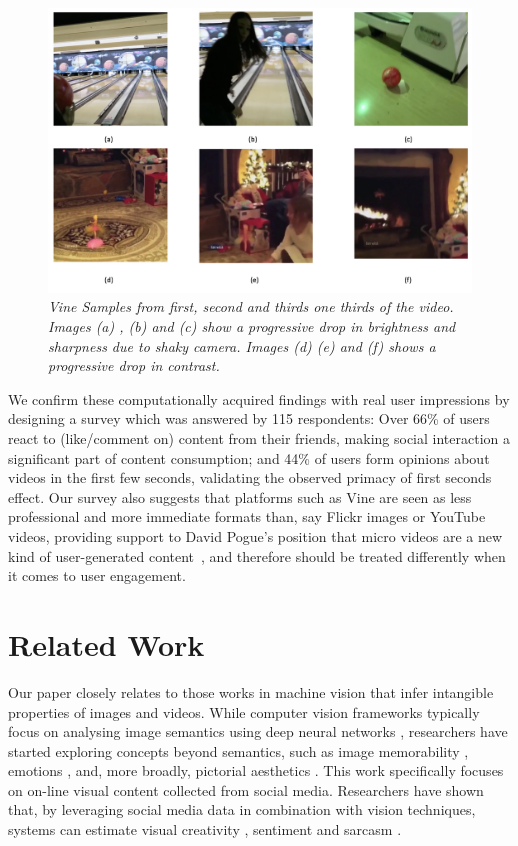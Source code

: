 \begin{figure}[!tbh]
    \centering
    \includegraphics[width=0.7\columnwidth]{Vine_samples2.png}
    \caption{\textsl{ Vine Samples from first, second and thirds one thirds of the video. Images (a) , (b) and (c) show a progressive drop in brightness and sharpness due to shaky camera. Images (d) (e) and (f) shows a progressive drop in contrast.}}
    \label{fig:Vine_samples}
\end{figure}

We confirm these computationally acquired findings with real user impressions by designing a survey which was answered by 115 respondents: Over 66\% of users react to (like/comment on) content from their friends, making social interaction a significant part of content consumption; and 44\% of users form opinions about videos in the first few seconds, validating the observed primacy of first seconds effect. Our survey also suggests that platforms such as Vine are seen as less professional and more immediate formats than, say Flickr images or YouTube videos, providing support to David Pogue's  position that micro videos are a new kind of user-generated content~\cite{pogue13}, and therefore should be treated differently when it comes to user engagement.



\section{ Related Work}
Our paper closely relates to those works  in machine vision that infer intangible properties of images and videos. While  computer vision frameworks typically focus on analysing image semantics using deep neural networks \cite{krizhevsky2012imagenet}, researchers have started exploring concepts beyond semantics, such as image memorability \cite{isola2011makes}, emotions \cite{Machajdik}, and, more broadly, pictorial aesthetics \cite{datta2008algorithmic,luo2008photo,goodSelfie}. 
This work specifically focuses on on-line visual content collected from social media. Researchers have shown that, by leveraging social media data in combination with vision techniques, systems can estimate visual creativity \cite{redi20146},  sentiment \cite{wang2015inferring,jou2015visual} and sarcasm \cite{schifanella2016detecting}. %

